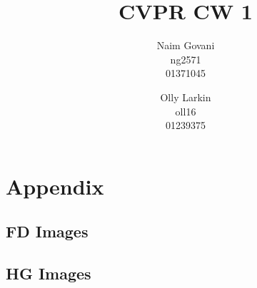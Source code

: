 \documentclass[10pt,twocolumn,letterpaper]{article}
\begin{document}
\title{CVPR CW 1}

\author{Naim Govani\\
ng2571\\
01371045\\
\and
Olly Larkin\\
oll16\\
01239375\\
}

\maketitle








\clearpage

{\small


}

\section{Appendix}
\subsection{FD Images}
\label{apx:fd}
\subsection{HG Images}
\label{apx:hg}
\end{document}
